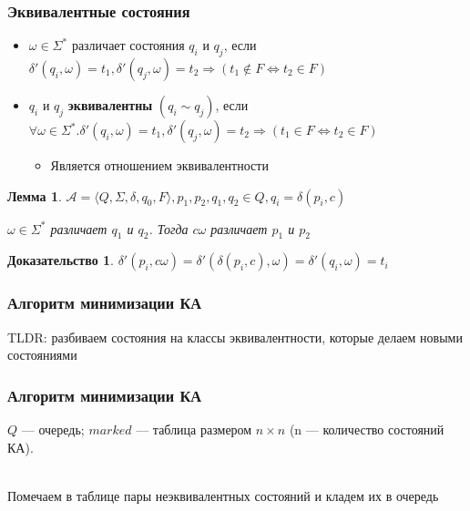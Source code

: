 \documentclass{beamer}
\newtheorem{ruproof}{Доказательство}
\newtheorem{rulemma}{Лемма}
\begin{document}
\begin{frame}[fragile]
  \transwipe[direction=90]
  \frametitle{Эквивалентные состояния}
  \begin{itemize}
    \item $\omega \in \Sigma^*$ различает состояния $q_i$ и $q_j$, если $\delta' (q_i, \omega) = t_1, \delta' (q_j, \omega) = t_2 \Rightarrow (t_1 \notin F \Leftrightarrow t_2 \in F)$
    \item $q_i$ и $q_j$ \textbf{эквивалентны} $(q_i \sim q_j)$, если $\forall \omega \in \Sigma^*. \delta' (q_i, \omega) = t_1, \delta' (q_j, \omega) = t_2 \Rightarrow (t_1 \in F \Leftrightarrow t_2 \in F)$
    \begin{itemize}
      \item Является отношением эквивалентности
    \end{itemize}
  \end{itemize}
   \begin{rulemma}
      $\mathcal{A} = \langle Q, \Sigma, \delta, q_0, F \rangle, p_1, p_2, q_1, q_2 \in Q, q_i = \delta(p_i, c)$
      
      $\omega \in \Sigma^*$ различает $q_1$ и $q_2$. Тогда $c \omega$ различает $p_1$ и $p_2$
   \end{rulemma}
   
   \begin{ruproof}
     $\delta' (p_i, c \omega) = \delta' (\delta (p_i, c), \omega) = \delta' (q_i, \omega) = t_i$
   \end{ruproof}
\end{frame}

\begin{frame}[fragile]
  \transwipe[direction=90]
  \frametitle{Алгоритм минимизации КА}
    TLDR: разбиваем состояния на классы эквивалентности, которые делаем новыми состояниями

\end{frame}

\begin{frame}[fragile]
  \transwipe[direction=90]
  \frametitle{Алгоритм минимизации КА}
   $Q$ --- очередь; $marked$ --- таблица размером $n \times n$ (n --- количество состояний КА).
   
   ~\\
    Помечаем в таблице пары неэквивалентных состояний и кладем их в очередь
\end{frame}
      
\end{document}
